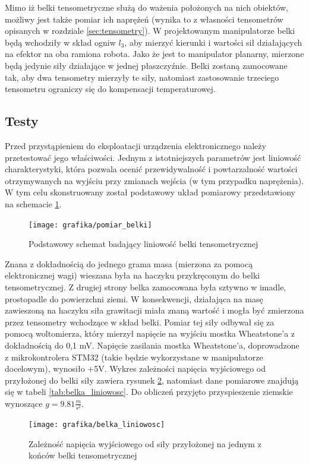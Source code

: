 \documentclass[printmode]{mgr}
\begin{document}
Mimo iż belki tensometryczne służą do ważenia położonych na nich obiektów, możliwy jest także pomiar ich naprężeń (wynika to
z własności tensometrów opisanych w rozdziale \ref{sec:tensometry}). W projektowanym manipulatorze belki będą wchodziły w skład ogniw $l_3$, aby mierzyć
kierunki i wartości sił działających na efektor na oba ramiona robota. Jako że jest to manipulator planarny, mierzone będą jedynie siły działające w
jednej płaszczyźnie. Belki zostaną zamocowane tak, aby dwa tensometry mierzyły te siły, natomiast zastosowanie trzeciego tensometru ograniczy się do
kompensacji temperaturowej.

\subsection{Testy}
Przed przystąpieniem do eksploatacji urządzenia elektronicznego należy przetestować jego właściwości. Jednym z istotniejszych parametrów
jest liniowość charakterystyki, która pozwala ocenić przewidywalność i powtarzalność wartości otrzymywanych na wyjściu przy zmianach
wejścia (w tym przypadku naprężenia). W tym celu skonstruowany został podstawowy układ pomiarowy przedstawiony na schemacie \ref{rys:pomiar_belki}.

\begin{figure}[tp]
\centering
  \texttt{[image: grafika/pomiar\_belki]}
  \caption{Podstawowy schemat badający liniowość belki tensometrycznej}
  \label{rys:pomiar_belki}  
\end{figure}

Znana z dokładnością do jednego grama masa (mierzona za pomocą elektronicznej wagi) wieszana była na haczyku przykręconym do belki
tensometrycznej. Z drugiej strony belka zamocowana była sztywno w imadle, prostopadle do powierzchni ziemi. W konsekwencji, działająca
na masę zawieszoną na haczyku siła grawitacji miała znaną wartość i mogła być zmierzona przez tensometry wchodzące w skład belki.
Pomiar tej siły odbywał się za pomocą woltomierza, który mierzył napięcie na wyjściu mostka Wheatstone'a z dokładnością do 0,1 mV.
Napięcie zasilania mostka Wheatstone'a, doprowadzone z mikrokontrolera STM32 (takie będzie wykorzystane w manipulatorze docelowym),
wynosiło +5V. Wykres zależności napięcia wyjściowego od przyłożonej do belki siły zawiera rysunek \ref{rys:belka_liniowosc}, natomiast
dane pomiarowe znajdują się w tabeli \ref{tab:belka_liniowosc}. Do obliczeń przyjęto przyspieszenie ziemskie wynoszące $g=9.81\frac{m}{s^2}$.

\begin{figure}[tp]
\centering
  \texttt{[image: grafika/belka\_liniowosc]}
  \caption{Zależność napięcia wyjściowego od siły przyłożonej na jednym z końców belki tensometrycznej}
  \label{rys:belka_liniowosc}  
\end{figure}
\end{document}
